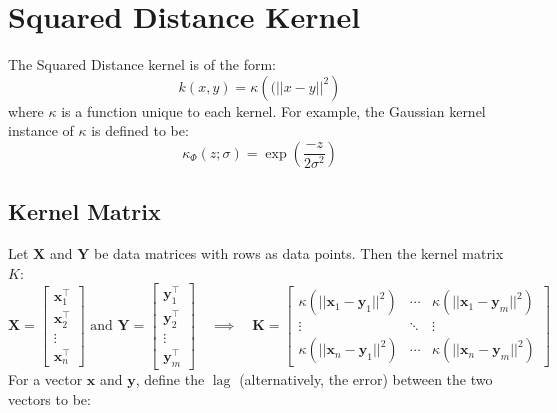 \documentclass[12pt, a4paper]{article}
\DeclareMathOperator{\lag}{lag}
\begin{document}
\section{Squared Distance Kernel}
The Squared Distance kernel is of the form:
\begin{equation*}
    k(x,y) = \kappa\left((||x - y||^2\right)
\end{equation*}
where $\kappa$ is a function unique to each kernel.  For example, the Gaussian kernel instance of $\kappa$ is defined to be:
\begin{equation*}
    \kappa_{\Phi}(z;\sigma) = \exp\left(\frac{-z}{2\sigma^2}\right)
\end{equation*}

\subsection{Kernel Matrix}
Let $\mathbf{X}$ and $\mathbf{Y}$ be data matrices with rows as data points. Then the kernel matrix $K$:
\begin{equation*}
    \mathbf{X} = \left[
        \begin{array}{c}
            \mathbf{x}_1^{\intercal} \\
            \mathbf{x}_2^{\intercal} \\
            \vdots \\
            \mathbf{x}_n^{\intercal}
        \end{array} 
    \right]
    \text{ and }
    \mathbf{Y} = \left[
        \begin{array}{c}
            \mathbf{y}_1^{\intercal} \\
            \mathbf{y}_2^{\intercal} \\
            \vdots \\
            \mathbf{y}_m^{\intercal}
        \end{array} 
    \right]
    \quad \implies \quad
    \mathbf{K} = \left[
        \begin{array}{ccc}
            \kappa\left(||\mathbf{x}_1 - \mathbf{y}_1||^2\right) & \cdots & \kappa\left(||\mathbf{x}_1 - \mathbf{y}_m||^2\right) \\
            \vdots & \ddots & \vdots \\
            \kappa\left(||\mathbf{x}_n - \mathbf{y}_1||^2\right) & \cdots & \kappa\left(||\mathbf{x}_n - \mathbf{y}_m||^2\right)
        \end{array} 
    \right]
\end{equation*}
For a vector $\mathbf{x}$ and $\mathbf{y}$, define the $\lag$ (alternatively, the error) between the two vectors to be:
\end{document}

